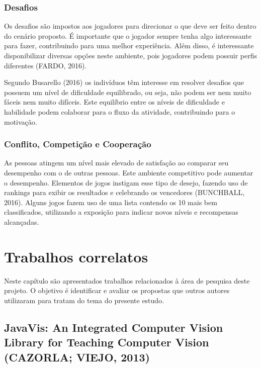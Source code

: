 \documentclass[
	12pt,				%
	oneside,			%
	a4paper,			%
	english,			%
	french,				%
	spanish,			%
	brazil,				%
	]{abntex2}
\begin{document}
\subsection{Desafios}                

Os desafios são impostos aos jogadores para direcionar o que deve ser feito dentro do cenário proposto. É importante que o jogador sempre tenha algo interessante para fazer, contribuindo para uma melhor experiência. Além disso, é interessante disponibilizar diversas opções neste ambiente, pois jogadores podem possuir perfis diferentes (FARDO, 2016).

Segundo Busarello (2016) os indivíduos têm interesse em resolver desafios que possuem um nível de dificuldade equilibrado, ou seja, não podem ser nem muito fáceis nem muito difíceis. Este equilíbrio entre os níveis de dificuldade e habilidade podem colaborar para o fluxo da atividade, contribuindo para o motivação.
    
\subsection{Conflito, Competição e Cooperação}                    

As pessoas atingem um nível mais elevado de satisfação ao comparar seu desempenho com o de outras pessoas. Este ambiente competitivo pode aumentar o desempenho. Elementos de jogos instigam esse tipo de desejo, fazendo uso de rankings para exibir os resultados e celebrando os vencedores  (BUNCHBALL, 2016). Alguns jogos fazem uso de uma lista contendo os 10 mais bem classificados, utilizando a exposição para indicar novos níveis e recompensas alcançadas.

\chapter{Trabalhos correlatos}

Neste capítulo são apresentados trabalhos relacionados à área de pesquisa deste projeto. O objetivo é identificar e avaliar os propostas que outros autores utilizaram para tratam do tema do presente estudo.

\section{JavaVis: An Integrated Computer Vision Library for Teaching Computer Vision (CAZORLA; VIEJO, 2013)}
\end{document}
